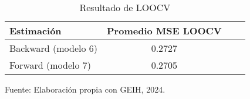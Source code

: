 \begin{table}[h]
    \centering
    \caption{Resultado de LOOCV}
    \begin{tabular}{lccc}
        \hline
        \textbf{Estimación} & \textbf{Promedio}  \textbf{MSE}  \textbf{LOOCV} \\
        \hline
        Backward (modelo 6) & 0.2727 \\
        Forward (modelo 7) & 0.2705 \\
        \hline
    \end{tabular}
    \label{tab:estimaciones loocv}
    \begin{center}
        \footnotesize{Fuente: Elaboración propia con GEIH, 2024.}
    \end{center}
\end{table}
